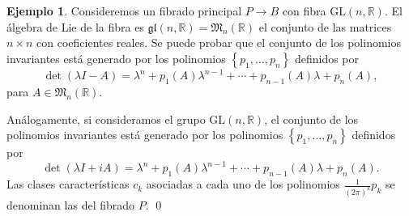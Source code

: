 \documentclass[12pt,a4paper]{article}
\theoremstyle{definition} \newtheorem{defn}[thm]{Definición}
\theoremstyle{definition} \newtheorem{ejemplo}[thm]{Ejemplo}
\theoremstyle{definition} \newtheorem{ejercicio}[thm]{Ejercicio}
\theoremstyle{remark} \newtheorem*{obs}{Observación}
\def\RR{\mathbb{R}}
\let\emph\relax
\begin{document}
	   \begin{ejemplo}
	     Consideremos un fibrado principal $P\rightarrow B$ con fibra $\mathrm{GL}(n,\RR)$. El álgebra de Lie de la fibra es $\mathfrak{gl}(n,\RR)=\mathfrak{M}_n(\RR)$ el conjunto de las matrices $n\times n$ con coeficientes reales. Se puede probar que el conjunto de los polinomios invariantes está generado por los polinomios $\left\{ p_1,\dots,p_n \right\}$ definidos por
	     \begin{equation*}
	       \det(\lambda I-A)=\lambda^n+p_1(A)\lambda^{n-1}+\cdots+p_{n-1}(A)\lambda + p_n(A),
	     \end{equation*}
	     para $A\in \mathfrak{M}_n(\RR)$.

	     Análogamente, si consideramos el grupo $\mathrm{GL}(n,\RR)$, el conjunto de los polinomios invariantes está generado por los polinomios $\left\{ p_1,\dots,p_n \right\}$ definidos por
	     \begin{equation*}
	       \det(\lambda I+iA)=\lambda^n+p_1(A)\lambda^{n-1}+\cdots+p_{n-1}(A)\lambda + p_n(A).
	     \end{equation*}
	     Las clases características $c_k$ asociadas a cada uno de los polinomios $\frac{1}{(2\pi)^k}p_k$ se denominan las \emph{clases de Chern} del fibrado $P$.
	     \qed
	   \end{ejemplo}
	  
\end{document}
